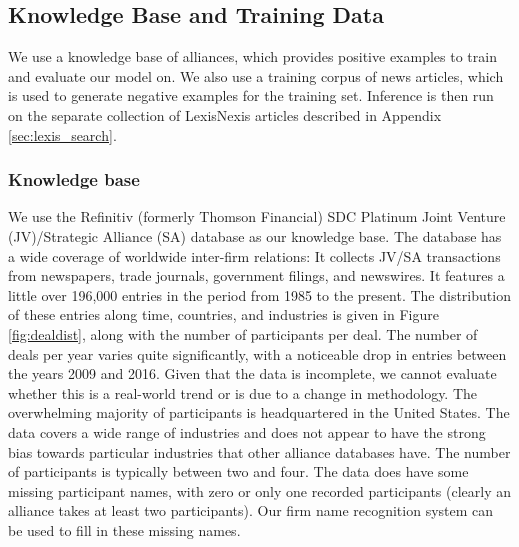 \subsection{Knowledge Base and Training Data}
\label{sec:knowledge_base} 
We use a knowledge base of alliances, which provides positive examples to train and evaluate our model on. We also use a training corpus of news articles, which is used to generate negative examples for the training set. Inference is then run on the separate collection of LexisNexis articles described in Appendix \ref{sec:lexis_search}.

\subsubsection{Knowledge base}
We use the Refinitiv (formerly Thomson Financial) SDC Platinum Joint Venture (JV)/Strategic Alliance (SA) database as our knowledge base. The database has a wide coverage of worldwide inter-firm relations: It collects JV/SA transactions from newspapers, trade journals, government filings, and newswires. It features a little over 196,000 entries in the period from 1985 to the present. The distribution of these entries along time, countries, and industries is given in Figure \ref{fig:dealdist}, along with the number of participants per deal. The number of deals per year varies quite significantly, with a noticeable drop in entries between the years 2009 and 2016. Given that the data is incomplete, we cannot evaluate whether this is a real-world trend or is due to a change in methodology. The overwhelming majority of participants is headquartered in the United States. The data covers a wide range of industries and does not appear to have the strong bias towards particular industries that other alliance databases have. The number of participants is typically between two and four. The data does have some missing participant names, with zero or only one recorded participants (clearly an alliance takes at least two participants). Our firm name recognition system can be used to fill in these missing names. \\\\
